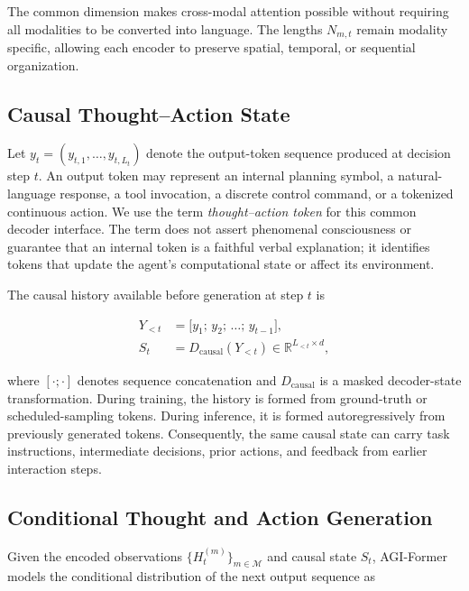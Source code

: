 The common dimension makes cross-modal attention possible without requiring all modalities to be converted into language. The lengths $N_{m,t}$ remain modality specific, allowing each encoder to preserve spatial, temporal, or sequential organization.

\subsection{\textbf{Causal Thought--Action State}}

Let $y_t=(y_{t,1},\ldots,y_{t,L_t})$ denote the output-token sequence produced at decision step $t$. An output token may represent an internal planning symbol, a natural-language response, a tool invocation, a discrete control command, or a tokenized continuous action. We use the term \textit{thought--action token} for this common decoder interface. The term does not assert phenomenal consciousness or guarantee that an internal token is a faithful verbal explanation; it identifies tokens that update the agent's computational state or affect its environment.

The causal history available before generation at step $t$ is

\begin{equation}
\begin{aligned}
    Y_{<t}
    &= \bigl[y_1;\,y_2;\,\ldots;\,y_{t-1}\bigr],\\
    S_t
    &= D_{\mathrm{causal}}\!\left(Y_{<t}\right)
     \in \mathbb{R}^{L_{<t}\times d},
\end{aligned}
\label{eq:causal_state}
\end{equation}

where $[\cdot;\cdot]$ denotes sequence concatenation and $D_{\mathrm{causal}}$ is a masked decoder-state transformation. During training, the history is formed from ground-truth or scheduled-sampling tokens. During inference, it is formed autoregressively from previously generated tokens. Consequently, the same causal state can carry task instructions, intermediate decisions, prior actions, and feedback from earlier interaction steps.

\subsection{\textbf{Conditional Thought and Action Generation}}

Given the encoded observations $\{H_t^{(m)}\}_{m\in\mathcal{M}}$ and causal state $S_t$, AGI-Former models the conditional distribution of the next output sequence as

